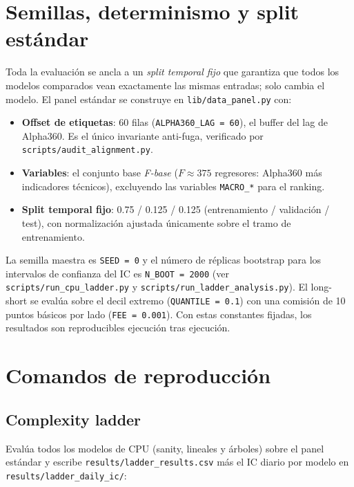 \section{Semillas, determinismo y split estándar}

Toda la evaluación se ancla a un \emph{split temporal fijo} que garantiza que
todos los modelos comparados vean exactamente las mismas entradas; solo cambia
el modelo. El panel estándar se construye en \texttt{lib/data\_panel.py} con:

\begin{itemize}
  \item \textbf{Offset de etiquetas}: 60 filas (\texttt{ALPHA360\_LAG = 60}),
        el buffer del lag de Alpha360. Es el único invariante anti-fuga,
        verificado por \texttt{scripts/audit\_alignment.py}.
  \item \textbf{Variables}: el conjunto base \emph{F-base}
        ($F\!\approx\!375$ regresores: Alpha360 más indicadores técnicos),
        excluyendo las variables \texttt{MACRO\_*} para el ranking.
  \item \textbf{Split temporal fijo}: 0.75 / 0.125 / 0.125
        (entrenamiento / validación / test), con normalización ajustada
        únicamente sobre el tramo de entrenamiento.
\end{itemize}

La semilla maestra es \texttt{SEED = 0} y el número de réplicas bootstrap para
los intervalos de confianza del IC es \texttt{N\_BOOT = 2000}
(ver \texttt{scripts/run\_cpu\_ladder.py} y \texttt{scripts/run\_ladder\_analysis.py}).
El long-short se evalúa sobre el decil extremo (\texttt{QUANTILE = 0.1}) con una
comisión de 10 puntos básicos por lado (\texttt{FEE = 0.001}). Con estas
constantes fijadas, los resultados son reproducibles ejecución tras ejecución.

\section{Comandos de reproducción}

\subsection{Complexity ladder}

Evalúa todos los modelos de CPU (sanity, lineales y árboles) sobre el panel
estándar y escribe \texttt{results/ladder\_results.csv} más el IC diario por
modelo en \texttt{results/ladder\_daily\_ic/}:

